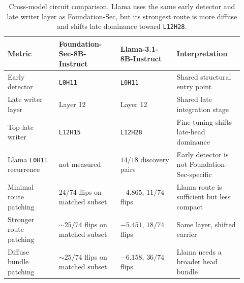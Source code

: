 \documentclass{article}
\begin{document}
\begin{table}[!htbp]
\centering
\caption{Cross-model circuit comparison. Llama uses the same early detector and late writer layer as Foundation-Sec, but its strongest route is more diffuse and shifts late dominance toward \texttt{L12H28}.}
\label{tab:model-comparison}
\begin{tabular}{@{}p{0.20\linewidth}p{0.24\linewidth}p{0.22\linewidth}p{0.26\linewidth}@{}}
\toprule
Metric & Foundation-Sec-8B-Instruct & Llama-3.1-8B-Instruct & Interpretation \\
\midrule
Early detector & \texttt{L0H11} & \texttt{L0H11} & Shared structural entry point \\
Late writer layer & Layer 12 & Layer 12 & Shared late integration stage \\
Top late writer & \texttt{L12H15} & \texttt{L12H28} & Fine-tuning shifts late-head dominance \\
Llama \texttt{L0H11} recurrence & not measured & \(14/18\) discovery pairs & Early detector is not Foundation-Sec-specific \\
Minimal route patching & \(24/74\) flips on matched subset & \(-4.865\), \(11/74\) flips & Llama route is sufficient but less compact \\
Stronger route patching & \(\sim25/74\) flips on matched subset & \(-5.451\), \(18/74\) flips & Same layer, shifted carrier \\
Diffuse bundle patching & \(\sim25/74\) flips on matched subset & \(-6.158\), \(36/74\) flips & Llama needs a broader head bundle \\
\bottomrule
\end{tabular}
\end{table}
\end{document}

